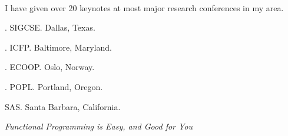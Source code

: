 \documentclass[11pt]{article}
\begin{document}
\bigskip

\noindent\hrulefill\\\noindent
{} 

\noindent I have given over 20 keynotes at most major research conferences in my area.

. SIGCSE. Dallas, Texas.

. ICFP. Baltimore, Maryland.

. ECOOP. Oslo, Norway.

. POPL. Portland, Oregon.

SAS. Santa Barbara, California.  

{\it Functional Programming is Easy, and Good for You\/}
\end{document}
